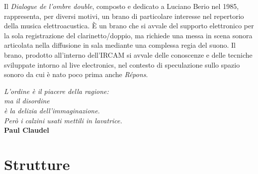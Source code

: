 
Il \emph{Dialogue de l'ombre double}, composto e dedicato a Luciano Berio nel 1985, rappresenta, per diversi motivi, un brano di particolare interesse nel repertorio della musica elettroacustica. È un brano che si avvale del supporto elettronico per la sola registrazione del clarinetto/doppio, ma richiede una messa in scena sonora articolata nella diffusione in sala mediante una complessa regia del suono. Il brano, prodotto all'interno dell'IRCAM si avvale delle conoscenze e delle tecniche sviluppate intorno al live electronics, nel contesto di speculazione sullo spazio sonoro da cui è nato poco prima anche \emph{Répons}.%

\clearpage

%
%

\begin{flushright}
{\small
\textit{
L'ordine è il piacere della ragione:\\ma il disordine\\ è la delizia dell'immaginazione.\\ Però i calzini usati mettili in lavatrice.\\
 }\textbf{Paul Claudel}}%
\end{flushright}


\section*{Strutture}



